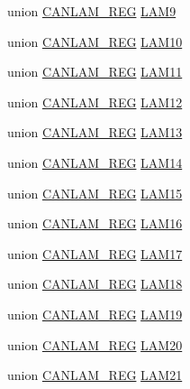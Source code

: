 \begin{DoxyCompactItemize}
\item 
union \hyperlink{union_c_a_n_l_a_m___r_e_g}{C\+A\+N\+L\+A\+M\+\_\+\+R\+E\+G} \hyperlink{struct_l_a_m___r_e_g_s_ac9cd380dc7da388a98978c750a673b0a}{L\+A\+M9}
\item 
union \hyperlink{union_c_a_n_l_a_m___r_e_g}{C\+A\+N\+L\+A\+M\+\_\+\+R\+E\+G} \hyperlink{struct_l_a_m___r_e_g_s_ac34aafffdb2c1804eabf5bd5dde9ebb7}{L\+A\+M10}
\item 
union \hyperlink{union_c_a_n_l_a_m___r_e_g}{C\+A\+N\+L\+A\+M\+\_\+\+R\+E\+G} \hyperlink{struct_l_a_m___r_e_g_s_a072fd0ae5b53b6a0cb709bd18c44386e}{L\+A\+M11}
\item 
union \hyperlink{union_c_a_n_l_a_m___r_e_g}{C\+A\+N\+L\+A\+M\+\_\+\+R\+E\+G} \hyperlink{struct_l_a_m___r_e_g_s_a027d721bebd04ba4b1f5bcb211872077}{L\+A\+M12}
\item 
union \hyperlink{union_c_a_n_l_a_m___r_e_g}{C\+A\+N\+L\+A\+M\+\_\+\+R\+E\+G} \hyperlink{struct_l_a_m___r_e_g_s_a11ce53b6f02d7076125cd82941e91a25}{L\+A\+M13}
\item 
union \hyperlink{union_c_a_n_l_a_m___r_e_g}{C\+A\+N\+L\+A\+M\+\_\+\+R\+E\+G} \hyperlink{struct_l_a_m___r_e_g_s_a66bd6a0bda0d73551ca3ad1c2ff9c667}{L\+A\+M14}
\item 
union \hyperlink{union_c_a_n_l_a_m___r_e_g}{C\+A\+N\+L\+A\+M\+\_\+\+R\+E\+G} \hyperlink{struct_l_a_m___r_e_g_s_a662832fd4338cd343dbee0bc93b832be}{L\+A\+M15}
\item 
union \hyperlink{union_c_a_n_l_a_m___r_e_g}{C\+A\+N\+L\+A\+M\+\_\+\+R\+E\+G} \hyperlink{struct_l_a_m___r_e_g_s_ae0faa5b1e90fdca85c33c6ad2a733ee8}{L\+A\+M16}
\item 
union \hyperlink{union_c_a_n_l_a_m___r_e_g}{C\+A\+N\+L\+A\+M\+\_\+\+R\+E\+G} \hyperlink{struct_l_a_m___r_e_g_s_a997aea795ef2a1bd2e725f120be02cc6}{L\+A\+M17}
\item 
union \hyperlink{union_c_a_n_l_a_m___r_e_g}{C\+A\+N\+L\+A\+M\+\_\+\+R\+E\+G} \hyperlink{struct_l_a_m___r_e_g_s_a70c6d402139eef8737281f2cb235d248}{L\+A\+M18}
\item 
union \hyperlink{union_c_a_n_l_a_m___r_e_g}{C\+A\+N\+L\+A\+M\+\_\+\+R\+E\+G} \hyperlink{struct_l_a_m___r_e_g_s_a3d6f3c961df75ccbc79faa466822e1a3}{L\+A\+M19}
\item 
union \hyperlink{union_c_a_n_l_a_m___r_e_g}{C\+A\+N\+L\+A\+M\+\_\+\+R\+E\+G} \hyperlink{struct_l_a_m___r_e_g_s_afda8cbaa7c3d69c87bbc481b35c6cae9}{L\+A\+M20}
\item 
union \hyperlink{union_c_a_n_l_a_m___r_e_g}{C\+A\+N\+L\+A\+M\+\_\+\+R\+E\+G} \hyperlink{struct_l_a_m___r_e_g_s_aa816ec214cd8e78942009d8637f82f73}{L\+A\+M21}

\end{DoxyCompactItemize}
